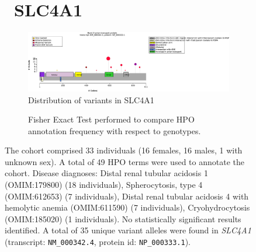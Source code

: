 \begin{figure}[htbp]
\section*{ SLC4A1}
\centering
\begin{subfigure}[b]{0.95\textwidth}
\centering
\includegraphics[width=\textwidth]{ img/SLC4A1_protein_diagram.pdf} 
\captionsetup{justification=raggedright,singlelinecheck=false}
\caption{Distribution of variants in SLC4A1}
\end{subfigure}

\vspace{2em}

\begin{subfigure}[b]{0.95\textwidth}
\centering
{}
\captionsetup{justification=raggedright,singlelinecheck=false}
\caption{Fisher Exact Test performed to compare HPO annotation frequency with respect to genotypes.}
\end{subfigure}

\vspace{2em}

\caption{The cohort comprised 33 individuals (16 females, 16 males, 1 with unknown sex). A total of 49 HPO terms were used to annotate the cohort. Disease diagnoses: Distal renal tubular acidosis 1 (OMIM:179800) (18 individuals), Spherocytosis, type 4 (OMIM:612653) (7 individuals), Distal renal tubular acidosis 4 with hemolytic anemia (OMIM:611590) (7 individuals), Cryohydrocytosis (OMIM:185020) (1 individuals). No statistically significant results identified. A total of 35 unique variant alleles were found in \textit{SLC4A1} (transcript: \texttt{NM\_000342.4}, protein id: \texttt{NP\_000333.1}).}
\end{figure}
